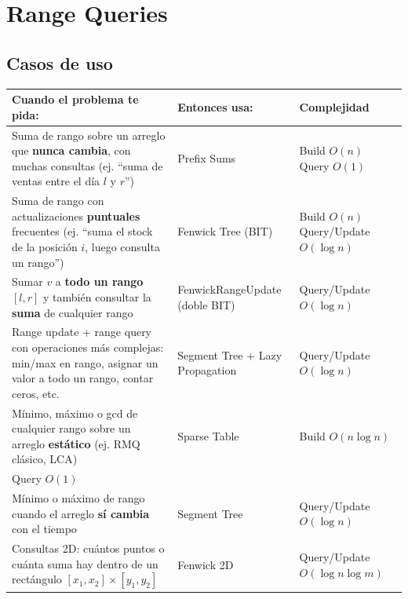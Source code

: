 \documentclass[10pt,a4paper,twocolumn]{article}
\begin{document}
\section{Range Queries}

\subsection{Casos de uso}

\begin{table}[H]
\raggedright
\scriptsize
\setlength{\tabcolsep}{2pt}
\renewcommand{\arraystretch}{1.1}
\begin{tabular}{|p{}|p{}|p{}|}
\hline
\textbf{Cuando el problema te pida:} &
\textbf{Entonces usa:} &
\textbf{Complejidad} \\
\hline

Suma de rango sobre un arreglo que \textbf{nunca cambia}, con muchas consultas
(ej. ``suma de ventas entre el día $l$ y $r$'') &
Prefix Sums &
Build $O(n)$ \newline Query $O(1)$ \\
\hline

Suma de rango con actualizaciones \textbf{puntuales} frecuentes
(ej. ``suma el stock de la posición $i$, luego consulta un rango'') &
Fenwick Tree (BIT) &
Build $O(n)$ \newline Query/Update $O(\log n)$ \\
\hline

Sumar $v$ a \textbf{todo un rango} $[l,r]$ y también consultar la
\textbf{suma} de cualquier rango &
FenwickRangeUpdate (doble BIT) &
Query/Update $O(\log n)$ \\
\hline

Range update + range query con operaciones más complejas:
min/max en rango, asignar un valor a todo un rango, contar ceros, etc. &
Segment Tree + Lazy Propagation &
Query/Update $O(\log n)$ \\
\hline

Mínimo, máximo o gcd de cualquier rango sobre un arreglo
\textbf{estático} (ej. RMQ clásico, LCA) &
Sparse Table &
Build $O(n\log n)$ \\ Query $O(1)$ \\
\hline

Mínimo o máximo de rango cuando el arreglo \textbf{sí cambia}
con el tiempo &
Segment Tree &
Query/Update $O(\log n)$ \\
\hline

Consultas 2D: cuántos puntos o cuánta suma hay dentro de un
rectángulo $[x_1,x_2]\times[y_1,y_2]$ &
Fenwick 2D &
Query/Update \newline $O(\log n\log m)$ \\
\hline


\end{tabular}
\end{table}
\end{document}

